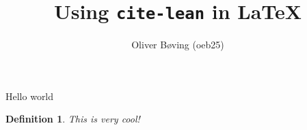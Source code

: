 \documentclass{article}
\title{Using \texttt{cite-lean} in \LaTeX}
\author{Oliver Bøving (oeb25)}
\newtheorem{definition}{Definition}
\begin{document}
\maketitle

Hello world

\begin{definition}
    This is very cool!
\end{definition}
\end{document}
